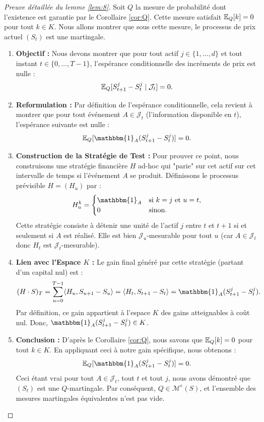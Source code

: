 \begin{proof}[Preuve détaillée du lemme \ref{lem:8}]
Soit $Q$ la mesure de probabilité dont l'existence est garantie par le Corollaire \ref{cor:Q}. Cette mesure satisfait $\mathbb{E}_Q[k]=0$ pour tout $k \in K$. Nous allons montrer que sous cette mesure, le processus de prix actuel $(S_t)$ est une martingale.

\begin{enumerate}
    \item \textbf{Objectif :} Nous devons montrer que pour tout actif $j \in \{1,\dots,d\}$ et tout instant $t \in \{0,\dots,T-1\}$, l'espérance conditionnelle des incréments de prix est nulle :
    \[
    \mathbb{E}_Q[S_{t+1}^j - S_t^j \mid \mathcal{J}_t] = 0.
    \]
    
    \item \textbf{Reformulation :} Par définition de l'espérance conditionnelle, cela revient à montrer que pour tout événement $A \in \mathcal{J}_t$ (l'information disponible en $t$), l'espérance suivante est nulle :
    \[
    \E_Q[\mathbbm{1}_A (S_{t+1}^j - S_t^j)] = 0.
    \]
    
    \item \textbf{Construction de la Stratégie de Test :} Pour prouver ce point, nous construisons une stratégie financière $H$ ad-hoc qui "parie" sur cet actif sur cet intervalle de temps si l'événement $A$ se produit. Définissons le processus prévisible $H = (H_u)$ par :
    \[
    H_u^k = 
    \begin{cases} 
    \mathbbm{1}_A & \text{si } k=j \text{ et } u=t, \\
    0 & \text{sinon.}
    \end{cases}
    \]
    Cette stratégie consiste à détenir une unité de l'actif $j$ entre $t$ et $t+1$ si et seulement si $A$ est réalisé. Elle est bien $\mathcal{J}_u$-mesurable pour tout $u$ (car $A \in \mathcal{J}_t$ donc $H_t$ est $\mathcal{J}_t$-mesurable).
    
    \item \textbf{Lien avec l'Espace $K$ :} Le gain final généré par cette stratégie (partant d'un capital nul) est :
    \[
    (H \cdot S)_T = \sum_{u=0}^{T-1} \langle H_u, S_{u+1} - S_u \rangle = \langle H_t, S_{t+1} - S_t \rangle = \mathbbm{1}_A (S_{t+1}^j - S_t^j).
    \]
    Par définition, ce gain appartient à l'espace $K$ des gains atteignables à coût nul. Donc, $\mathbbm{1}_A (S_{t+1}^j - S_t^j) \in K$.
    
    \item \textbf{Conclusion :} D'après le Corollaire \ref{cor:Q}, nous savons que $\mathbb{E}_Q[k] = 0$ pour tout $k \in K$. En appliquant ceci à notre gain spécifique, nous obtenons :
    \[
    \E_Q[\mathbbm{1}_A (S_{t+1}^j - S_t^j)] = 0.
    \]
    Ceci étant vrai pour tout $A \in \mathcal{J}_t$, tout $t$ et tout $j$, nous avons démontré que $(S_t)$ est une $Q$-martingale. Par conséquent, $Q \in \mathcal{M}^e(S)$, et l'ensemble des mesures martingales équivalentes n'est pas vide.
\end{enumerate}
\end{proof}

